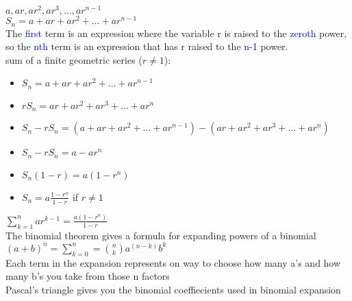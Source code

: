 \documentclass{article}
\begin{document}
$a, ar, ar^2, ar^3, \ldots, ar^{n-1}$\\
$S_n = a + ar + ar^2 + \ldots + ar^{n-1}$\\

The \textcolor{blue}{first} term is an expression where the variable r is raised to the \textcolor{blue}{zeroth} power, so the \textcolor{blue}{nth} term is an expression that has r raised to the \textcolor{blue}{n-1} power.\\ 

sum of a finite geometric series ($r \neq 1$):
	\begin{itemize}
		\item $S_n = a + ar + ar^2 + \ldots + ar^{n-1}$ 
		\item $rS_n = ar + ar^2 + ar^3 + \ldots + ar^{n}$   
		\item $S_n - rS_n = (a + ar + ar^2 + \ldots + ar^{n-1}) - (ar + ar^2 + ar^3 + \ldots + ar^{n})$
		\item $S_n - rS_n = a - ar^n$
		\item $S_n(1 - r) = a(1 - r^n)$
		\item $S_n = a\frac{1 - r^n}{1 - r}$ if $r \neq 1$ 
	\end{itemize}

$\sum_{k = 1}^{n} ar^{k - 1} = \frac{a(1-r^n)}{1 - r}$\\

The binomial theorem gives a formula for expanding powers of a binomial\\

$(a + b)^n = \sum_{k = 0}^{n} = \binom{n}{k}a^{(n-k)}b^{k}$\\

Each term in the expansion represents on way to choose how many a's and how many b's you take from those n factors\\

Pascal's triangle gives you the binomial coeffiecients used in binomial expansion\\

\begin{center}
\end{center}
\end{document}
